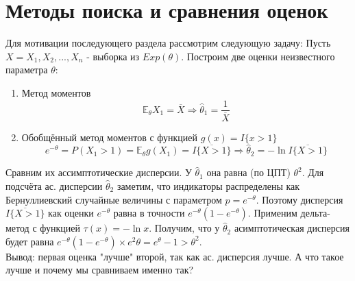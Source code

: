 \documentclass[a4paper,12pt]{article}
\newcommand{\expec}{\mathbb{E}}
\newcommand{\sample}{X_1, X_2, ..., X_n}
\theoremstyle{named}
\begin{document}
\section{Методы поиска и сравнения оценок}
Для мотивации последующего раздела рассмотрим следующую задачу: Пусть $X = \sample$ - выборка из $Exp(\theta)$. Построим две оценки неизвестного 
параметра $\theta$:
\begin{enumerate}
    \item Метод моментов
    \begin{equation}
        \expec_\theta X_1 = \overline{X} \Rightarrow \hat\theta_1 = \frac{1}{\overline{X}}
    \end{equation}
    \item Обобщённый метод моментов с функцией $g(x) = I \{ x > 1\}$
    \begin{equation}
        e^{-\theta} = P(X_1 > 1) = \expec_\theta g(X_1) = \overline{I \{ X > 1\}} \Rightarrow \hat\theta_2 = -\ln\overline{I \{ X > 1\}}
    \end{equation}
\end{enumerate}
Сравним их ассимптотические дисперсии. У $\hat\theta_1$ она равна (по ЦПТ) $\theta^2$. Для подсчёта ас. дисперсии $\hat\theta_2$ заметим, что
индикаторы распределены как Бернуллиевский случайные величины с параметром $p=e^{-\theta}$. Поэтому дисперсия $\overline{I \{ X > 1\}}$ как оценки 
$e^{-\theta}$ равна в точности $e^{-\theta}(1-e^{-\theta})$. Применим дельта-метод с функцией $\tau(x) = -\ln x$. Получим, что у $\hat\theta_2$ 
асимптотическая дисперсия будет равна $e^{-\theta}(1-e^{-\theta})\times e^2\theta = e^\theta - 1 > \theta^2$. \\
Вывод: первая оценка "лучше" второй, так как ас. дисперсия лучше. А что такое лучше и почему мы сравниваем именно так?
\end{document}
